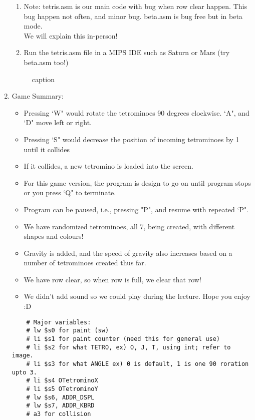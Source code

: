\documentclass{article}
\begin{document}
\begin{enumerate}
    \begin{enumerate}

\item Note:
tetris.asm is our main code with bug when row clear happen. This bug happen not often, and minor bug.
beta.asm is bug free but in beta mode.\\

We will explain this in-person!\\


    \item Run the tetris.asm file in a MIPS IDE such as Saturn or Mars
(try beta.asm too!)

    \end{enumerate}

    

\begin{figure}[ht!]
    \centering
    \caption{caption}
    \label{Instructions}
\end{figure}

\item Game Summary:
\begin{itemize}
\item Pressing `W" would rotate the tetrominoes 90 degrees clockwise. `A", and `D" move left or right.
\item Pressing `S" would decrease the position of incoming tetrominoes by 1 until it collides
\item If it collides, a new tetromino is loaded into the screen.
\item For this game version, the program is design to go on until program stops or you press `Q" to terminate.
\item Program can be paused, i.e., pressing "P", and resume with repeated `P".
\item We have randomized tetrominoes, all 7, being created, with different shapes and colours!
\item Gravity is added, and the speed of gravity also increases based on a number of tetrominoes created thus far.
\item We have row clear, so when row is full, we clear that row!
\item We didn't add sound so we could play during the lecture. Hope you enjoy :D

\end{itemize}

\begin{verbatim}
    # Major variables:
    # lw $s0 for paint (sw)
    # li $s1 for paint counter (need this for general use)
    # li $s2 for what TETRO, ex) O, J, T, using int; refer to image.
    # li $s3 for what ANGLE ex) 0 is default, 1 is one 90 roration upto 3.
    # li $s4 OTetrominoX
    # li $s5 OTetrominoY
    # lw $s6, ADDR_DSPL
    # lw $s7, ADDR_KBRD
    # a3 for collision
\end{verbatim}


    
\end{enumerate}
\end{document}
